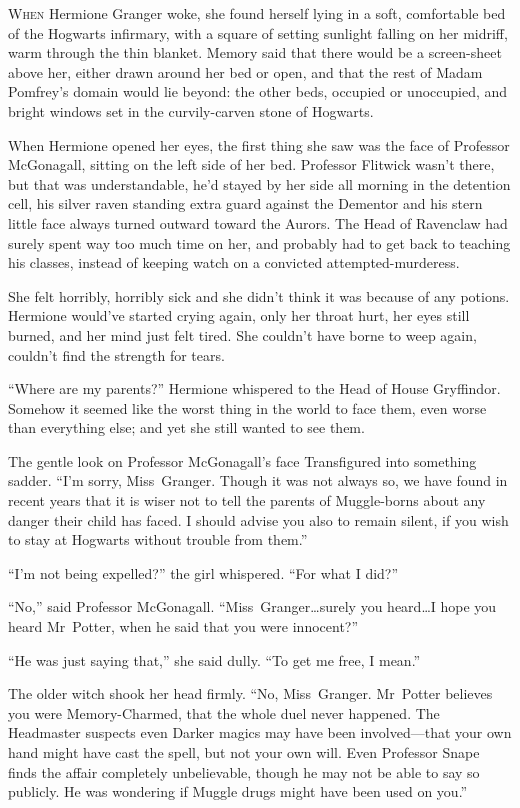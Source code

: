 
\lettrine{W}{hen} Hermione Granger woke, she found herself lying in a soft, comfortable bed of the Hogwarts infirmary, with a square of setting sunlight falling on her midriff, warm through the thin blanket. Memory said that there would be a screen-sheet above her, either drawn around her bed or open, and that the rest of Madam Pomfrey’s domain would lie beyond: the other beds, occupied or unoccupied, and bright windows set in the curvily-carven stone of Hogwarts.

When Hermione opened her eyes, the first thing she saw was the face of Professor McGonagall, sitting on the left side of her bed. Professor Flitwick wasn’t there, but that was understandable, he’d stayed by her side all morning in the detention cell, his silver raven standing extra guard against the Dementor and his stern little face always turned outward toward the Aurors. The Head of Ravenclaw had surely spent way too much time on her, and probably had to get back to teaching his classes, instead of keeping watch on a convicted attempted-murderess.

She felt horribly, horribly sick and she didn’t think it was because of any potions. Hermione would’ve started crying again, only her throat hurt, her eyes still burned, and her mind just felt tired. She couldn’t have borne to weep again, couldn’t find the strength for tears.

“Where are my parents?” Hermione whispered to the Head of House Gryffindor. Somehow it seemed like the worst thing in the world to face them, even worse than everything else; and yet she still wanted to see them.

The gentle look on Professor McGonagall’s face Transfigured into something sadder. “I’m sorry, Miss~Granger. Though it was not always so, we have found in recent years that it is wiser not to tell the parents of Muggle-borns about any danger their child has faced. I should advise you also to remain silent, if you wish to stay at Hogwarts without trouble from them.”

“I’m not being expelled?” the girl whispered. “For what I did?”

“No,” said Professor McGonagall. “Miss~Granger…surely you heard…I hope you heard Mr~Potter, when he said that you were innocent?”

“He was just saying that,” she said dully. “To get me free, I mean.”

The older witch shook her head firmly. “No, Miss~Granger. Mr~Potter believes you were Memory-Charmed, that the whole duel never happened. The Headmaster suspects even Darker magics may have been involved—that your own hand might have cast the spell, but not your own will. Even Professor Snape finds the affair completely unbelievable, though he may not be able to say so publicly. He was wondering if Muggle drugs might have been used on you.”

